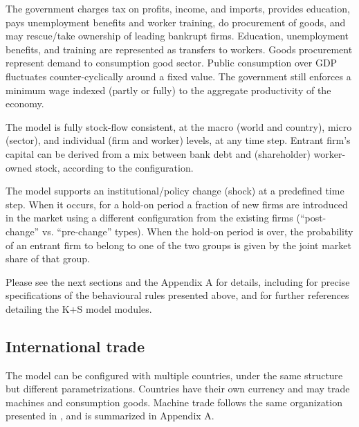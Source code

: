 \documentclass[a4paper,11pt]{article}
\begin{document}
The government charges tax on profits, income, and imports, provides education, pays unemployment benefits and worker training, do procurement of goods, and may rescue/take ownership of leading bankrupt firms. Education, unemployment benefits, and training are represented as transfers to workers. Goods procurement represent demand to consumption good sector. Public consumption over GDP fluctuates counter-cyclically around a fixed value. The government still enforces a minimum wage indexed (partly or fully) to the aggregate productivity of the economy.

The model is fully stock-flow consistent, at the macro (world and country), micro (sector), and individual (firm and worker) levels, at any time step. Entrant firm's capital can be derived from a mix between bank debt and (shareholder) worker-owned stock, according to the configuration.

The model supports an institutional/policy change (shock) at a predefined time step. When it occurs, for a hold-on period a fraction of new firms are introduced in the market using a different configuration from the existing firms (``post-change'' vs. ``pre-change'' types). When the hold-on period is over, the probability of an entrant firm to belong to one of the two groups is given by the joint market share of that group.

\bigskip

Please see the next sections and the Appendix A for details, including for precise specifications of the behavioural rules presented above, and for further references detailing the K+S model modules.


\subsection{International trade}

The model can be configured with multiple countries, under the same structure but different
parametrizations. Countries have their own currency and may trade machines and consumption goods. Machine trade follows the same organization presented in \cite{fanti2024ns}, and is summarized in Appendix A.
\end{document}

